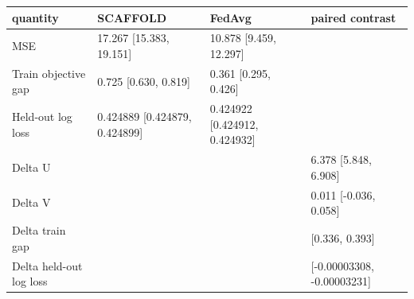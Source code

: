 \begin{tabular}{llll}
quantity & SCAFFOLD & FedAvg & paired contrast \\
\hline
MSE & 17.267 [15.383, 19.151] & 10.878 [9.459, 12.297] &  \\
Train objective gap & 0.725 [0.630, 0.819] & 0.361 [0.295, 0.426] &  \\
Held-out log loss & 0.424889 [0.424879, 0.424899] & 0.424922 [0.424912, 0.424932] &  \\
Delta U &  &  & 6.378 [5.848, 6.908] \\
Delta V &  &  & 0.011 [-0.036, 0.058] \\
Delta train gap &  &  & [0.336, 0.393] \\
Delta held-out log loss &  &  & [-0.00003308, -0.00003231] \\
\end{tabular}
